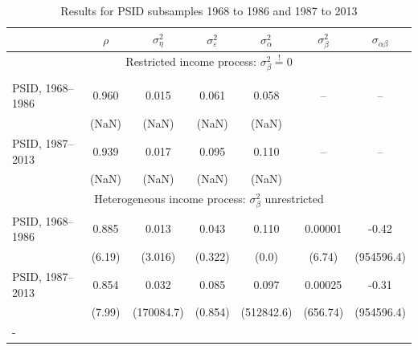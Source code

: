 \begin{table}%
\begin{tabular}{l|cccccc}
                       &$\rho$ & $\sigma^2_{\eta}$&$\sigma^2_{\varepsilon}$&$\sigma^2_{\alpha}$&$\sigma^2_{\beta}$&$\sigma_{\alpha \beta}$\\
\hline
\hline
\multicolumn{7}{c}{Restricted income process: $\sigma^2_{\beta} \stackrel{!}{=} 0$} \\
\hline \\
PSID, 1968--1986      & 0.960 &  0.015           &   0.061                &       0.058       &        --        &        --             \\
                &\footnotesize{(NaN)}&\footnotesize{(NaN)}&\footnotesize{(NaN)}& \footnotesize{(NaN)} &          &                       \\
PSID, 1987--2013      & 0.939 &  0.017           &   0.095                &       0.110       &        --        &        --             \\
                &\footnotesize{(NaN)}&\footnotesize{(NaN)}&\footnotesize{(NaN)}& \footnotesize{(NaN)} &          &                       \\
\hline
\multicolumn{7}{c}{Heterogeneous income process: $\sigma^2_{\beta}$ unrestricted} \\
\hline
PSID, 1968--1986      & 0.885 &  0.013           &   0.043                &       0.110       &      0.00001     &      -0.42            \\
           & \footnotesize{(6.19)}  & \footnotesize{(3.016)}& \footnotesize{(0.322)} & \footnotesize{(0.0)}&\footnotesize{(6.74)}  & \footnotesize{(954596.4)}    \\
PSID, 1987--2013      & 0.854 &  0.032           &   0.085                &       0.097       &      0.00025     &      -0.31            \\
           & \footnotesize{(7.99)}  & \footnotesize{(170084.7)}& \footnotesize{(0.854)} & \footnotesize{(512842.6)}&\footnotesize{(656.74)}  & \footnotesize{(954596.4)}    \\
\hline-
\end{tabular}
\caption{Results for PSID subsamples 1968 to 1986 and 1987 to 2013}
\label{tab:psid_subsample}
\end{table}

